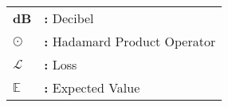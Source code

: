 \hspace{-3mm}
\begin{tabular}{p{2cm}l}
    {\bf{dB}} & {\bf:} Decibel\\
    {\bf{\(\odot\)}} & {\bf:} Hadamard Product Operator\\
    {\bf{\(\mathcal{L}\)}} & {\bf:} Loss\\ 
    {\bf{\(\mathbb{E}\)}} & {\bf:} Expected Value\\
\end{tabular}